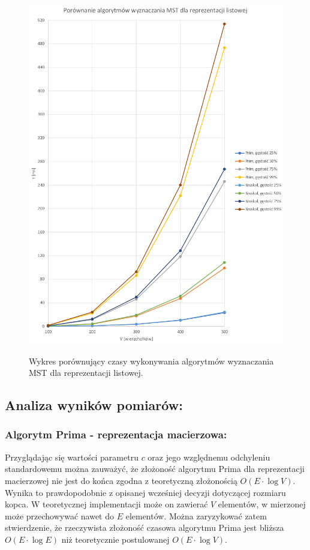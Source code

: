 \documentclass[a4paper,12pt]{article}
\begin{document}
\begin{figure}[H]
	\centering
	\caption{\centering Wykres porównujący czasy wykonywania algorytmów wyznaczania MST dla reprezentacji listowej.}
	\includegraphics[width=14cm]{fig6.png}
	\label{fig.wykres-lista-mst}
\end{figure}

\subsection{Analiza wyników pomiarów:}

\subsubsection{Algorytm Prima - reprezentacja macierzowa:}
Przyglądając się wartości parametru $c$ oraz jego względnemu odchyleniu standardowemu można zauważyć, że złożoność algorytmu Prima dla reprezentacji macierzowej nie jest do końca zgodna z teoretyczną złożonością $O(E \cdot \log V)$. Wynika to prawdopodobnie z opisanej wcześniej decyzji dotyczącej rozmiaru kopca. W teoretycznej implementacji może on zawierać $V$ elementów, w mierzonej może przechowywać nawet do $E$ elementów. Można zaryzykować zatem stwierdzenie, że rzeczywista złożoność czasowa algorytmu Prima jest bliższa $O(E \cdot \log E)$ niż teoretycznie postulowanej $O(E \cdot \log V)$.\\
\end{document}
